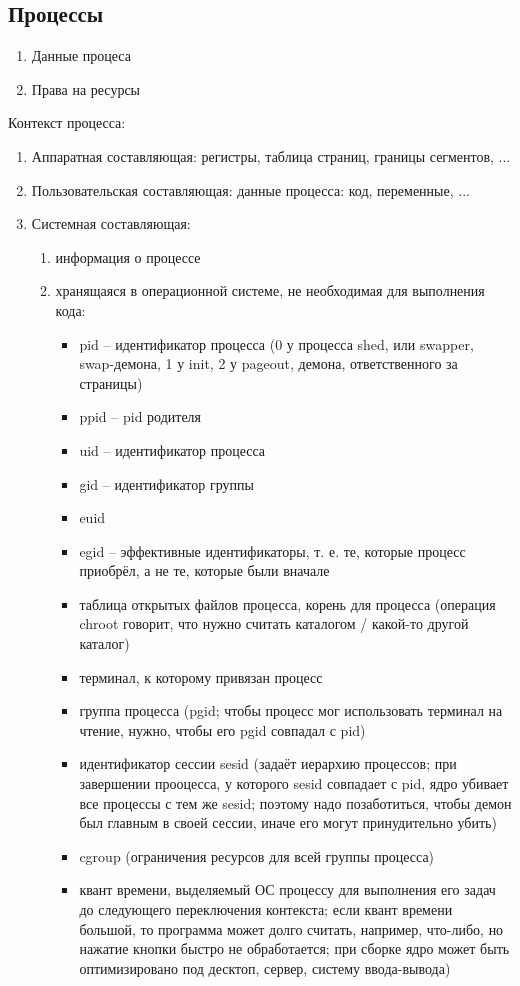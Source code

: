 \documentclass[a4paper,10pt]{article}
\begin{document}
\subsection{Процессы}
\begin{enumerate}
\item Данные процеса
\item Права на ресурсы
\end{enumerate}
Контекст процесса:
\begin{enumerate}
\item Аппаратная составляющая: регистры, таблица страниц, границы сегментов, ...
\item Пользовательская составляющая: данные процесса: код, переменные, ... 
\item Системная составляющая: 
\begin{enumerate}
\item информация о процессе
\item хранящаяся в операционной системе, не необходимая для выполнения кода: 
\begin{itemize}
\item pid -- идентификатор процесса (0 у процесса shed, или swapper, swap-демона, 1 у init, 2 у pageout, демона, ответственного за страницы) 
\item ppid -- pid родителя
\item uid -- идентификатор процесса
\item gid -- идентификатор группы
\item euid
\item egid -- эффективные идентификаторы, т. е. те, которые процесс приобрёл, а не те, которые были вначале
\item таблица открытых файлов процесса, корень для процесса (операция chroot говорит, что нужно считать каталогом / какой-то другой каталог)
\item терминал, к которому привязан процесс
\item группа процесса (pgid; чтобы процесс мог использовать терминал на чтение, нужно, чтобы его pgid совпадал с pid)
\item идентификатор сессии sesid (задаёт иерархию процессов; при завершении прооцесса, у которого sesid совпадает с pid, ядро убивает все процессы с тем же sesid; поэтому надо позаботиться, чтобы демон был главным в своей сессии, иначе его могут принудительно убить)
\item cgroup (ограничения ресурсов для всей группы процесса)
\item квант времени, выделяемый ОС процессу для выполнения его задач до следующего переключения контекста; если квант времени большой, то программа может долго считать, например, что-либо, но нажатие кнопки быстро не обработается; при сборке ядро может быть оптимизировано под десктоп, сервер, систему ввода-вывода)

\end{itemize}
\end{enumerate}
\end{enumerate}
\end{document}
